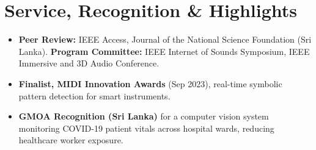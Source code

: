 \documentclass[11pt]{article}
\begin{document}
\section*{Service, Recognition \& Highlights}
\begin{itemize}[leftmargin=1.2em, itemsep=-0.25em]
    \item \textbf{Peer Review:} IEEE Access, Journal of the National Science Foundation (Sri Lanka). \textbf{Program Committee:} IEEE Internet of Sounds Symposium, IEEE Immersive and 3D Audio Conference.
    \item \textbf{Finalist, MIDI Innovation Awards} (Sep 2023), real-time symbolic pattern detection for smart instruments. 
    \item \textbf{GMOA Recognition (Sri Lanka)} for a computer vision system monitoring COVID-19 patient vitals across hospital wards, reducing healthcare worker exposure.
\end{itemize}
\end{document}
